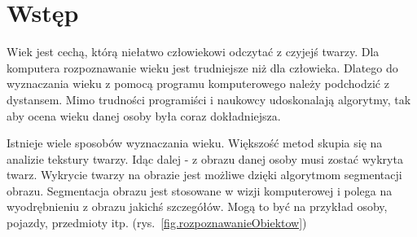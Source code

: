\documentclass[a4paper,twoside,12pt]{book}
\newcounter{stronyPozaNumeracja}
\begin{document}
    \vfill




    \cleardoublepage


    \pagestyle{tylkoNumeryStron}
    \tableofcontents

    \setcounter{stronyPozaNumeracja}{\value{page}}
    \mainmatter
    \pagestyle{NumeryStronNazwyRozdzialow}


    \chapter{Wstęp}\label{ch:wstęp}

    Wiek jest cechą, którą niełatwo człowiekowi odczytać z czyjejś twarzy.
    Dla komputera rozpoznawanie wieku jest
    trudniejsze niż dla człowieka.
    Dlatego do wyznaczania wieku z pomocą programu komputerowego należy podchodzić z dystansem.
    Mimo trudności programiści
    i naukowcy udoskonalają algorytmy,
    tak aby ocena wieku danej osoby była coraz dokładniejsza.

    Istnieje wiele sposobów wyznaczania wieku.
    Większość metod skupia się na analizie tekstury twarzy.
    Idąc dalej - z obrazu danej osoby musi zostać wykryta twarz.
    Wykrycie twarzy na obrazie jest możliwe dzięki algorytmom segmentacji obrazu.
    Segmentacja obrazu jest stosowane w wizji komputerowej i polega na wyodrębnieniu z obrazu jakichś szczegółów.
    Mogą to być na przykład osoby, pojazdy, przedmioty itp. (rys.~\ref{fig.rozpoznawanieObiektow})
\end{document}
